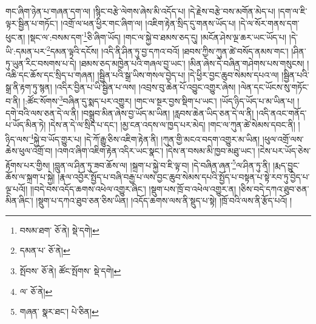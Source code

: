 གང་ཞིག་ཉེན་པ་གཞན་དག་ལ། །སྙིང་བརྩེ་ལེགས་ཞེས་མི་འདོད་པ། །དེ་རྗེས་བརྩེ་བས་མགོན་མེད་པ། །དག་ལ་ཇི་ལྟར་སྦྱིན་པ་གཏོང་། །འགྲོ་ལ་ཕན་ཕྱིར་གང་ཞིག་ལ། །འཇིག་རྟེན་སྲིད་དུ་གནས་ཡོད་པ། །དེ་ལ་སོར་གནས་དག་ཕུང་ན། །སྡང་ལ་:བསམ་དག་\footnote{བསམ་ཐག་  ཅོ་ནེ།  སྡེ་དགེ། }ཅི་ཞིག་ཡོད། །གང་ལ་སྐྱེ་བ་ཐམས་ཅད་དུ། །མངོན་ཤེས་ལྔ་ཆར་ཡང་ཡོད་པ། །དེ་ཡི་:དམན་པར་\footnote{དམན་པ་  ཅོ་ནེ། }དམན་ལྟའི་དངོས། །འདི་ནི་ཤིན་ཏུ་བྱ་དཀའ་བའོ། །ཐབས་ཀྱིས་ཀུན་ཚེ་བསོད་ནམས་གང་། །ཤིན་ཏུ་ཡུན་རིང་བསགས་པ་དེ། །ཐམས་ཅད་མཁྱེན་པའི་གཞལ་བྱ་ཡང་། །མིན་ཞེས་དེ་བཞིན་གཤེགས་པས་གསུངས། །འཆི་དང་ཆོས་དང་སྲིད་པ་གཞན། །སྦྱིན་པའི་སྒྲ་ཡིས་གསལ་བྱེད་པ། །དེ་ཕྱིར་བྱང་ཆུབ་སེམས་དཔའ་ལ། །སྦྱིན་པའི་སྒྲ་ནི་རྟག་ཏུ་སྙན། །འདིར་བྱིན་པ་ཡི་སྦྱིན་པ་ལས། །འབྲས་བུ་ཆེན་པོ་འབྱུང་འགྱུར་ཞེས། །ལེན་དང་ཡོངས་སུ་གཏོང་བ་ནི། །:ཚོང་སོགས་\footnote{སྤོབས་  ཅོ་ནེ། ཚོང་སྤོགས་  སྡེ་དགེ། }བཞིན་དུ་སྨད་པར་འགྱུར། །གང་ལ་སྔར་བྱས་སྡིག་པ་ཡང་། །ཡོད་ཉིད་ཡོད་པ་མ་ཡིན་པ། །དགེ་བའི་ལས་ཅན་དེ་ལ་ནི། །བསྒྲུབ་མིན་ཞེས་བྱ་ཡོད་མ་ཡིན། །རླབས་ཆེན་ཡིད་ཅན་དེ་ལ་ནི། །འདི་ནའང་གནོད་པ་ཡོད་མིན་ཏེ། །དེས་ན་དེ་ལ་སྲིད་པ་དང་། །མྱ་ངན་འདས་ལ་ཁྱད་པར་མེད། །གང་ལ་ཀུན་ཚེ་སེམས་དབང་ནི། །ཉིད་ལས་\footnote{ལ་  ཅོ་ནེ། }སྐྱེ་བ་ཡོད་གྱུར་པ། །དེ་ཀོ་རྒྱུ་ཅིས་འཇིག་རྟེན་ནི། །ཀུན་གྱི་མངའ་བདག་འགྱུར་མ་ཡིན། །ཕུལ་འགྲོ་ལས་ཆེས་ཕུལ་འགྲོ་བ། །འགའ་ཞིག་འཇིག་རྟེན་འདིར་ཡང་སྣང་། །དེས་ན་བསམ་མི་ཁྱབ་མཐུ་ཡང་། །ངེས་པར་ཡོད་ཅེས་རྟོགས་པར་གྱིས། །བླུན་ལ་ཤིན་ཏུ་ཟབ་ཆོས་ལ། །སྐྲག་པ་སྐྱེ་བ་ཇི་ལྟ་བ། །དེ་བཞིན་ཞན་\footnote{གཞན་  སྣར་ཐང་།  པེ་ཅིན། }ལ་ཤིན་ཏུ་ནི། །རྨད་བྱུང་ཆོས་ལ་སྐྲག་པ་སྐྱེ། །རྣལ་འབྱོར་སྤྱོད་པ་བཞི་བརྒྱ་པ་ལས་བྱང་ཆུབ་སེམས་དཔའི་སྤྱོད་པ་བསྟན་པ་སྟེ་རབ་ཏུ་བྱེད་པ་ལྔ་པའོ།། །།བདེ་བས་འདོད་ཆགས་འཕེལ་འགྱུར་ཞིང་། །སྡུག་པས་ཁྲོ་བ་འཕེལ་འགྱུར་ན། །ཅིས་བདེ་དཀའ་ཐུབ་ཅན་མིན་ཞིང་། །སྡུག་པ་དཀའ་ཐུབ་ཅན་ཅིས་ཡིན། །འདོད་ཆགས་ལས་ནི་སྡུད་པ་སྟེ། །ཁྲོ་བའི་ལས་ནི་རྩོད་པའོ། །
